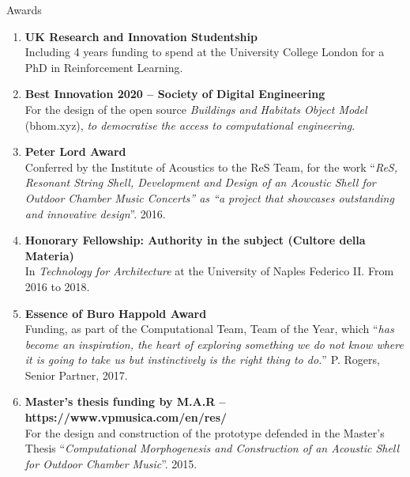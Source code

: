 \documentclass{resume}
\begin{document}
    \begin{rSection}{Awards}
    \begin{enumerate}[leftmargin=0.45cm, itemsep=0em, topsep=0.5em, parsep=0.2em]
        \item
        \textbf{UK Research and Innovation Studentship} \\
        Including 4 years funding to spend at the University College London for a PhD in Reinforcement Learning.
        \item
        \textbf{Best Innovation 2020 – Society of Digital Engineering} \\
        For the design of the open source \textit{Buildings and Habitats Object Model} (bhom.xyz), \textit{to democratise the access to computational engineering}.
        \item
        \textbf{Peter Lord Award} \\
        Conferred by the Institute of Acoustics to the ReS Team, for the work “\textit{ReS, Resonant String Shell, Development and Design of an Acoustic Shell for Outdoor Chamber Music Concerts” as “a project that showcases outstanding and innovative design}”. 2016.
        \item
        \textbf{Honorary Fellowship: Authority in the subject (Cultore della Materia)} \\
        In \textit{Technology for Architecture} at the University of Naples Federico II.
        From 2016 to 2018.
        \item
        \textbf{Essence of Buro Happold Award} \\
        Funding, as part of the Computational Team, Team of the Year, which “\textit{has become an inspiration, the heart of exploring something we do not know where it is going to take us but instinctively is the right thing to do.}” P. Rogers, Senior Partner, 2017.
        \item
        \textbf{Master’s thesis funding by M.A.R – https://www.vpmusica.com/en/res/}  \\
    For the design and construction of the prototype defended in the Master’s Thesis “\textit{Computational Morphogenesis and Construction of an Acoustic Shell for Outdoor Chamber Music}”. 2015.
    \end{enumerate}
\end{rSection}
\end{document}
